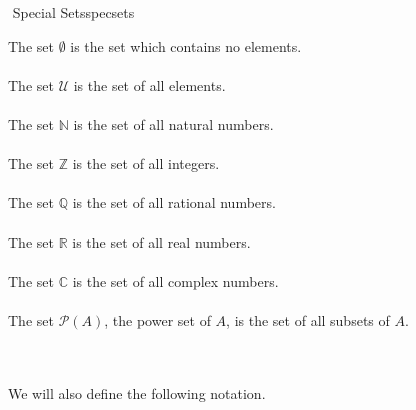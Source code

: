         \begin{definition}{\Stop\,\,Special Sets}{specsets}
        
            The set \(\emptyset\) is the set which contains no elements.
            \\
            \\
            The set \(\mathcal{U}\) is the set of all elements.
            \\
            \\
            The set \(\mathbb{N}\) is the set of all natural numbers.
            \\
            \\
            The set \(\mathbb{Z}\) is the set of all integers.
            \\
            \\
            The set \(\mathbb{Q}\) is the set of all rational numbers.
            \\
            \\
            The set \(\mathbb{R}\) is the set of all real numbers.
            \\
            \\
            The set \(\mathbb{C}\) is the set of all complex numbers.
            \\
            \\
            The set \(\mathcal{P}(A)\), the power set of \(A\), is the set of all subsets of \(A\).
        
        \end{definition}
        \vphantom
        \\
        \\
        We will also define the following notation.
